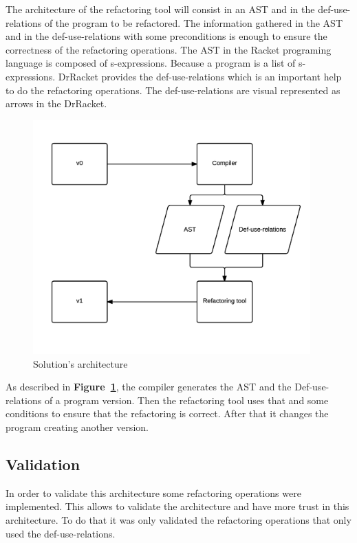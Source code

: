 The architecture of the refactoring tool will consist in an AST and in the def-use-relations of the program to be refactored.
The information gathered in the AST and in the def-use-relations with some preconditions is enough to ensure the correctness of the refactoring operations.
The AST in the Racket programing language is composed of s-expressions. Because a program is a list of s-expressions.
DrRacket provides the def-use-relations which is an important help to do the refactoring operations. The def-use-relations are visual represented as arrows in the DrRacket.

\begin{figure}[htbp]
	\centering
	\includegraphics[width=0.95\textwidth]{img/arquitectura.png}
	\caption{Solution's architecture}
	\label{fig:architecture}
\end{figure}

As described in {\bf Figure~\ref{fig:architecture}}, the compiler generates the AST and the Def-use-relations of a program version. Then the refactoring tool uses that and some conditions to ensure that the refactoring is correct. After that it changes the program creating another version.

\subsection{Validation}
In order to validate this architecture some refactoring operations were implemented. 
This allows to validate the architecture and have more trust in this architecture.
To do that it was only validated the refactoring operations that only used the def-use-relations.

